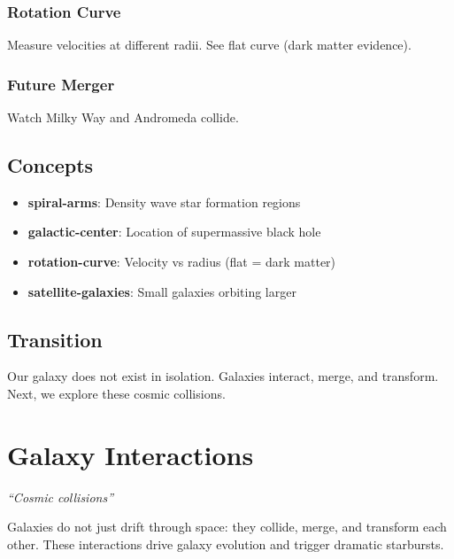 \documentclass[
  11pt,
  letterpaper,
  twoside,
  openright]{book}
\providecommand{\tightlist}{%
  \setlength{\itemsep}{0pt}\setlength{\parskip}{0pt}}
\begin{document}
\subsection{Rotation Curve}\label{rotation-curve}

Measure velocities at different radii. See flat curve (dark matter
evidence).

\subsection{Future Merger}\label{future-merger}

Watch Milky Way and Andromeda collide.

\section{Concepts}\label{concepts-26}

\begin{itemize}
\tightlist
\item
  \textbf{spiral-arms}: Density wave star formation regions
\item
  \textbf{galactic-center}: Location of supermassive black hole
\item
  \textbf{rotation-curve}: Velocity vs radius (flat = dark matter)
\item
  \textbf{satellite-galaxies}: Small galaxies orbiting larger
\end{itemize}

\section{Transition}\label{transition-26}

Our galaxy does not exist in isolation. Galaxies interact, merge, and
transform. Next, we explore these cosmic collisions.

\chapter{Galaxy Interactions}\label{sec-galaxy-interactions}

\emph{``Cosmic collisions''}

\begin{tcolorbox}[enhanced jigsaw, leftrule=.75mm, title=\textcolor{quarto-callout-note-color}{\faInfo}\hspace{0.5em}{Key Revelation}, bottomrule=.15mm, opacityback=0, coltitle=black, arc=.35mm, colframe=quarto-callout-note-color-frame, colbacktitle=quarto-callout-note-color!10!white, colback=white, titlerule=0mm, breakable, bottomtitle=1mm, toptitle=1mm, rightrule=.15mm, toprule=.15mm, left=2mm, opacitybacktitle=0.6]

Galaxies do not just drift through space: they collide, merge, and
transform each other. These interactions drive galaxy evolution and
trigger dramatic starbursts.

\end{tcolorbox}
\end{document}
